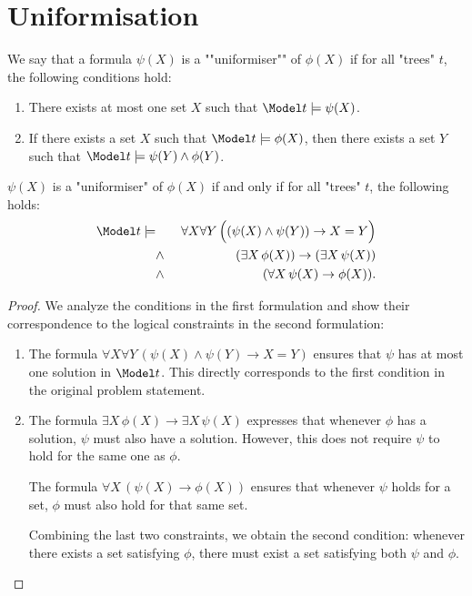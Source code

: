 \documentclass{article}
\begin{document}
\section{Uniformisation}



\begin{definition}[Uniformiser]
	We say that a formula $\psi(X)$ is a ""uniformiser"" of $\phi(X)$ if for all "trees" $t$, the following conditions hold:
	\begin{enumerate}
		\item There exists at most one set $X$ such that $\Model t \models \psi(X)$.
		\item If there exists a set $X$ such that $\Model t \models \phi(X)$, then there exists a set $Y$ such that $\Model t \models \psi(Y) \land \phi(Y)$.
	\end{enumerate}
\end{definition}

\begin{lemma}
	$\psi(X)$ is a "uniformiser" of $\phi(X)$ if and only if for all "trees" $t$, the following holds:
	\begin{eqnarray*}
		\Model t \models &\quad &  \forall X \forall Y \, \Big((\psi(X) \land \psi(Y)) \rightarrow X = Y\Big) \\
		& \land & (\exists X \, \phi(X)) \rightarrow (\exists X \, \psi(X)) \\
		& \land& (\forall X \, \psi(X) \rightarrow \phi(X)).
	\end{eqnarray*}
\end{lemma}

\begin{proof}
	We analyze the conditions in the first formulation and show their correspondence to the logical constraints in the second formulation:

	\begin{enumerate}
		\item The formula $\forall X \forall Y \, (\psi(X) \land \psi(Y) \rightarrow X = Y)$ ensures that $\psi$ has at most one solution
		      in $\Model t$. This directly corresponds to the first condition in the original problem statement.

		\item The formula $\exists X \, \phi(X) \rightarrow \exists X \, \psi(X)$ expresses that whenever $\phi$ has a solution, $\psi$ must also have a solution.
		      However, this does not require $\psi$ to hold for the same one as $\phi$.

		      The formula $\forall X \, (\psi(X) \rightarrow \phi(X))$ ensures that whenever $\psi$ holds for a set, $\phi$ must also hold for that same set.

		      Combining the last two constraints, we obtain the second condition: whenever there exists a set satisfying $\phi$, there must exist a set
		      satisfying both $\psi$ and $\phi$.
	\end{enumerate}
\end{proof}
\end{document}

